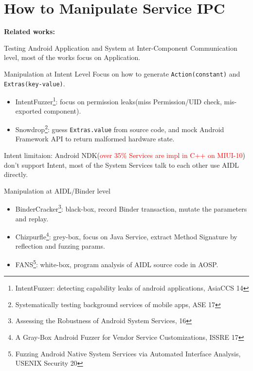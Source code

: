 \documentclass[notheorems, aspectratio=54]{beamer}
\begin{document}
\section{How to Manipulate Service IPC}
\begin{frame}

	\textbf{Related works:}
	
	Testing Android Application and System at Inter-Component Communication level, most of the works focus on Application.

	\begin{block}{Manipulation at Intent Level}
		Focus on how to generate \texttt{Action(constant)} and \texttt{Extras(key-value)}.
		\begin{itemize}
			\item IntentFuzzer\footnote{\tiny{IntentFuzzer: detecting capability leaks of android applications, AsiaCCS 14}}: focus on permission leaks(miss Permission/UID check, mis-exported component).
			\item Snowdrop\footnote{\tiny{Systematically testing background services of mobile apps, ASE 17}}: guess \texttt{Extras.value} from source code, and mock Android Framework API to return malformed hardware state.
		\end{itemize}
	\end{block}
\end{frame}

\begin{frame}
	Intent limitaion: Android NDK(\textcolor{red}{over 35\% Services are impl in C++ on MIUI-10}) don't support Intent, most of the System Services talk to each other use AIDL directly.

	\begin{block}{Manipulation at AIDL/Binder level}
		\begin{itemize}
			\item BinderCracker\footnote{\tiny{Assessing the Robustness of Android System Services, 16}}: black-box, record Binder transaction, mutate the parameters and replay.
			\item Chizpurfle\footnote{\tiny{A Gray-Box Android Fuzzer for Vendor Service Customizations, ISSRE 17}}: grey-box, focus on Java Service, extract Method Signature by reflection and fuzzing params.
			\item FANS\footnote{\tiny{Fuzzing Android Native System Services via Automated Interface Analysis, USENIX Security 20}}: white-box, program analysis of AIDL source code in AOSP.
		\end{itemize}
	\end{block}
	
\end{frame}
\end{document}
